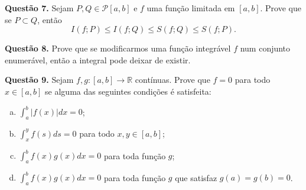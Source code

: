 \documentclass[10pt]{article}
\theoremstyle{definition}
\begin{document}
\noindent
\textbf{Questão 7.}
Sejam $P,Q \in \mathcal P[a,b]$ e $f$ uma função limitada em $[a,b]$.
Prove que se $P \subset Q$, então
\begin{equation*}
	I(f; P) \leq I(f; Q) \leq S(f; Q) \leq S(f;P).
\end{equation*}
\vspace{5mm}

\noindent
\textbf{Questão 8.}
Prove que se modificarmos uma função integrável $f$
num conjunto enumerável, então a integral pode deixar de existir.
\vspace{5mm}

\noindent
\textbf{Questão 9.}
Sejam $f,g:[a,b] \to \mathbb R$ contínuas. Prove que $f=0$ para todo $x \in [a,b]$ se alguma
das seguintes condições é satisfeita:
\begin{enumerate}[a)]
	\item $\int^b_a |f(x)| dx = 0$;
	\item $\int^y_x f(s) ds = 0$ para todo $x,y \in [a,b]$;
	\item $\int^b_a f(x)g(x) dx = 0$ para toda função $g$;
	\item $\int^b_a f(x)g(x) dx = 0$ para toda função $g$ que satisfaz $g(a) = g(b) =0$.
\end{enumerate}
\vspace{5mm}
\nocite{*}

  
  
\end{document}
